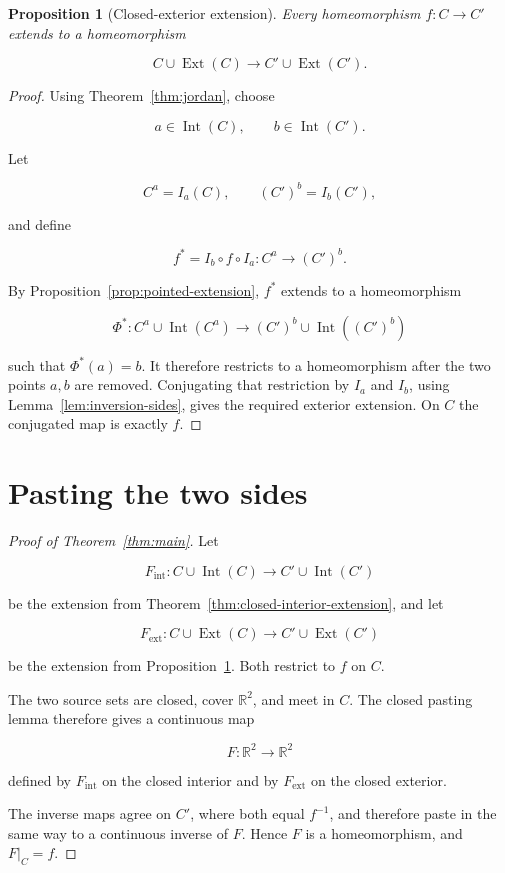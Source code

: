 \documentclass[11pt]{article}
\theoremstyle{mainplain}
\newtheorem{proposition}[theorem]{Proposition}
\theoremstyle{mainroman}
\theoremstyle{definition}
\numberwithin{equation}{section}
\begin{document}
\begin{proposition}[Closed-exterior extension]\label{prop:exterior-extension}
Every homeomorphism \(f:C\to C'\) extends to a homeomorphism

\[
C\cup\operatorname{Ext}(C)
 \longrightarrow
C'\cup\operatorname{Ext}(C').
\]
\end{proposition}
\begin{proof}
Using Theorem~\ref{thm:jordan}, choose

\[
a\in\operatorname{Int}(C),
\qquad
b\in\operatorname{Int}(C').
\]

Let

\[
C^a=I_a(C),
\qquad
(C')^b=I_b(C'),
\]

and define

\[
f^*
 =
I_b\circ f\circ I_a
:
C^a\longrightarrow(C')^b.
\]

By Proposition~\ref{prop:pointed-extension}, \(f^*\) extends to a homeomorphism

\[
\Phi^*:
C^a\cup\operatorname{Int}(C^a)
 \longrightarrow
(C')^b\cup\operatorname{Int}((C')^b)
\]

such that \(\Phi^*(a)=b\). It therefore restricts to a homeomorphism after the two points \(a,b\) are removed. Conjugating that restriction by \(I_a\) and \(I_b\), using Lemma~\ref{lem:inversion-sides}, gives the required exterior extension. On \(C\) the conjugated map is exactly \(f\). \end{proof}

\section{Pasting the two sides}\label{pasting-the-two-sides}

\begin{proof}[Proof of Theorem~\ref{thm:main}]
Let

\[
F_{\mathrm{int}}:
C\cup\operatorname{Int}(C)
\longrightarrow
C'\cup\operatorname{Int}(C')
\]

be the extension from Theorem~\ref{thm:closed-interior-extension}, and let

\[
F_{\mathrm{ext}}:
C\cup\operatorname{Ext}(C)
\longrightarrow
C'\cup\operatorname{Ext}(C')
\]

be the extension from Proposition~\ref{prop:exterior-extension}. Both restrict to \(f\) on \(C\).

The two source sets are closed, cover \(\mathbb R^2\), and meet in \(C\). The closed pasting lemma therefore gives a continuous map

\[
F:\mathbb R^2\longrightarrow\mathbb R^2
\]

defined by \(F_{\mathrm{int}}\) on the closed interior and by \(F_{\mathrm{ext}}\) on the closed exterior.

The inverse maps agree on \(C'\), where both equal \(f^{-1}\), and therefore paste in the same way to a continuous inverse of \(F\). Hence \(F\) is a homeomorphism, and \(F|_C=f\).
\end{proof}
\end{document}
